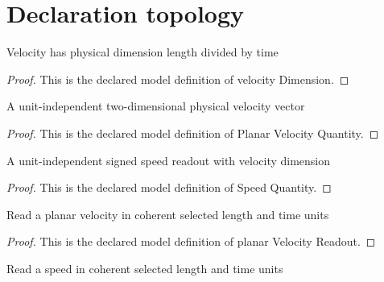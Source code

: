 \section{Declaration topology}
\begin{definition}
  \label{def:physics:phyx-mini-0524:phyxminiproblems-problemphyxmini0524-velocitydimension}
  Velocity has physical dimension length divided by time
\end{definition}
\begin{proof}
  This is the declared model definition of velocity Dimension.
\end{proof}
\begin{definition}
  \label{def:physics:phyx-mini-0524:phyxminiproblems-problemphyxmini0524-planarvelocityquantity}
  A unit-independent two-dimensional physical velocity vector
\end{definition}
\begin{proof}
  This is the declared model definition of Planar Velocity Quantity.
\end{proof}
\begin{definition}
  \label{def:physics:phyx-mini-0524:phyxminiproblems-problemphyxmini0524-speedquantity}
  A unit-independent signed speed readout with velocity dimension
\end{definition}
\begin{proof}
  This is the declared model definition of Speed Quantity.
\end{proof}
\begin{definition}
  \label{def:physics:phyx-mini-0524:phyxminiproblems-problemphyxmini0524-planarvelocityreadout}
  Read a planar velocity in coherent selected length and time units
\end{definition}
\begin{proof}
  This is the declared model definition of planar Velocity Readout.
\end{proof}
\begin{definition}
  \label{def:physics:phyx-mini-0524:phyxminiproblems-problemphyxmini0524-speedreadout}
  Read a speed in coherent selected length and time units
\end{definition}
